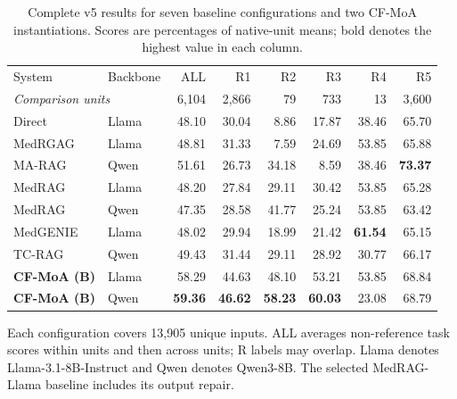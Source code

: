 \begin{table}[t]
\centering
\small
\setlength{\tabcolsep}{5.5pt}
\caption{Complete v5 results for seven baseline configurations and two CF-MoA instantiations. Scores are percentages of native-unit means; bold denotes the highest value in each column.}
\label{tab:main-system-results}
\begin{tabular}{llrrrrrr}
\toprule
System & Backbone & ALL & R1 & R2 & R3 & R4 & R5 \\
\multicolumn{2}{l}{\emph{Comparison units}} & 6,104 & 2,866 & 79 & 733 & 13 & 3,600 \\
\midrule
Direct & Llama & 48.10 & 30.04 & 8.86 & 17.87 & 38.46 & 65.70 \\
MedRGAG & Llama & 48.81 & 31.33 & 7.59 & 24.69 & 53.85 & 65.88 \\
MA-RAG & Qwen & 51.61 & 26.73 & 34.18 & 8.59 & 38.46 & \textbf{73.37} \\
MedRAG & Llama & 48.20 & 27.84 & 29.11 & 30.42 & 53.85 & 65.28 \\
MedRAG & Qwen & 47.35 & 28.58 & 41.77 & 25.24 & 53.85 & 63.42 \\
MedGENIE & Llama & 48.02 & 29.94 & 18.99 & 21.42 & \textbf{61.54} & 65.15 \\
TC-RAG & Qwen & 49.43 & 31.44 & 29.11 & 28.92 & 30.77 & 66.17 \\
\midrule
\textbf{CF-MoA (B)} & Llama & 58.29 & 44.63 & 48.10 & 53.21 & 53.85 & 68.84 \\
\textbf{CF-MoA (B)} & Qwen & \textbf{59.36} & \textbf{46.62} & \textbf{58.23} & \textbf{60.03} & 23.08 & 68.79 \\
\bottomrule
\end{tabular}
\par\smallskip
\begin{minipage}{0.97\textwidth}\footnotesize Each configuration covers 13,905 unique inputs. ALL averages non-reference task scores within units and then across units; R labels may overlap. Llama denotes Llama-3.1-8B-Instruct and Qwen denotes Qwen3-8B. The selected MedRAG-Llama baseline includes its output repair.\end{minipage}
\end{table}
